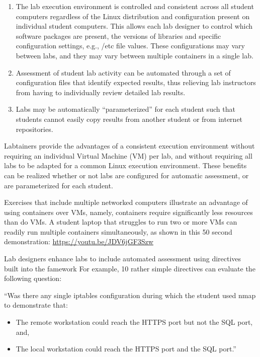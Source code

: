 \documentclass[12pt]{article}
\begin{document}
\begin{enumerate}
\item The lab execution environment is controlled and consistent
across all student computers regardless of the Linux distribution
and configuration present on individual student computers.  
This allows each lab designer to control
which software packages are present, the versions of libraries and
specific configuration settings, e.g., /etc file values. These configurations
may vary between labs, and they may vary between multiple containers in
a single lab.

\item Assessment of student lab activity can be automated through a
set of configuration files that identify expected results, thus
relieving lab instructors from having to individually review detailed lab
results.

\item Labs may be automatically ``parameterized'' for each student such that
students cannot easily copy results from another student or from internet
repositories.  
\end{enumerate}

Labtainers provide the advantages of a consistent
execution environment without requiring
an individual Virtual Machine (VM) per lab, and without requiring all labs to be adapted for
a common Linux execution environment.   These benefits can be realized 
whether or not labs are configured for automatic assessment, 
or are parameterized for each student.

Exercises that include multiple networked computers illustrate an advantage 
of using containers over VMs, namely, containers require significantly less resources
than do VMs.  A student laptop that struggles to run two or more VMs can readily 
run multiple containers simultaneously, as shown in this 50 second demonstration: \url{https://youtu.be/JDV6jGF3Szw} 

Lab designers enhance labs to include automated assessment using directives built into the famework 
For example, 10 rather simple directives can evaluate the following question:

``Was there any
single iptables configuration during which the student used nmap to demonstrate that:
\begin{itemize}
\item The remote workstation could reach the HTTPS port but not the SQL port, and,
\item The local workstation could reach the HTTPS port and the SQL port.''
\end{itemize}
\end{document}
